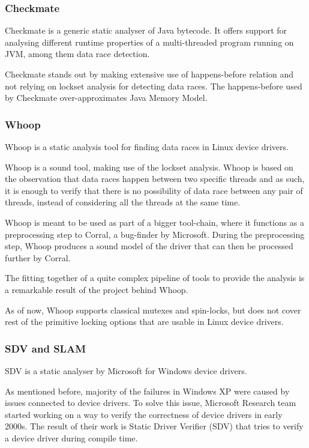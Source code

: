\documentclass[..thesis.tex]{subfiles}
\begin{document}
\subsubsection{Checkmate}

Checkmate\cite{ferrara_checkmate:_2009} is a generic static analyser of Java bytecode.
It offers support for analysing different runtime properties of a multi-threaded program running on JVM, among them data race detection.

Checkmate stands out by making extensive use of happens-before relation and not relying on lockset analysis for detecting data races.
The happens-before used by Checkmate over-approximates Java Memory Model.

\subsubsection{Whoop}

Whoop\cite{deligiannis_fast_2015} is a static analysis tool for finding data races in Linux device drivers. 

Whoop is a sound tool, making use of the lockset analysis. Whoop is based on the observation that data races happen between two specific threads and as such,
it is enough to verify that there is no possibility of data race between any pair of threads, instead of considering all the threads at the same time.

Whoop is meant to be used as part of a bigger tool-chain, where it functions as a preprocessing step to Corral, a bug-finder by Microsoft. During the preprocessing step,
Whoop produces a sound model of the driver that can then be processed further by Corral.

The fitting together of a quite complex pipeline of tools to provide the analysis is a remarkable result of the project behind Whoop.

As of now, Whoop supports classical mutexes and spin-locks, but does not cover rest of the primitive locking options that are usable in Linux device drivers. 

\subsubsection{SDV and SLAM}

SDV is a static analyser by Microsoft for Windows device drivers.

As mentioned before, majority of the failures in Windows XP were caused by issues connected to device drivers. To solve this issue,
Microsoft Research team started working on a way to verify the correctness of device drivers in early 2000s.
The result of their work is Static Driver Verifier (SDV) that tries to verify a device driver during compile time. 
\end{document}
